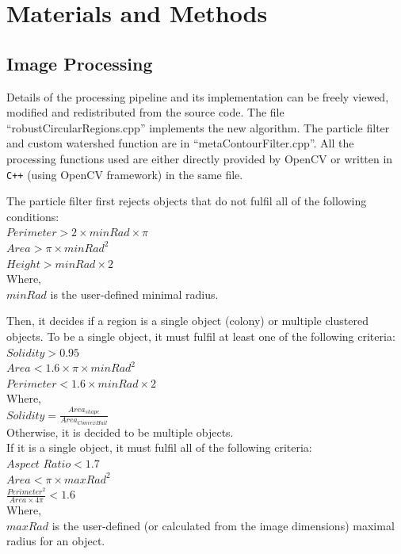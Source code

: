 \documentclass[10pt]{article}
\begin{document}
\section*{Materials and Methods} 

\subsection*{Image Processing} 
Details of the processing pipeline and its implementation can be freely viewed,
modified and redistributed from the source code. The file
``robustCircularRegions.cpp'' implements the new algorithm. The particle filter
and custom watershed function are in ``metaContourFilter.cpp''.
All the processing functions used are either directly provided by OpenCV or
written in \texttt{C++} (using OpenCV framework) in the same file.

The particle filter first rejects objects that do not fulfil all of the following conditions:\\
\newline{}
$Perimeter > 2\times{}minRad\times{}\pi $\\
$Area > \pi\times{}{minRad}^2$\\
$Height > minRad\times{}2$\\
\newline{}
Where,\\ 
$minRad$ is the user-defined minimal radius.

Then, it decides if a region is a single object (colony) or multiple clustered
objects. To be a single object, it must fulfil at least one of the following
criteria:\\
\newline{}
$Solidity > 0.95$\\
$Area <  1.6 \times{}\pi\times{}{minRad}^2$\\
$Perimeter < 1.6 \times{} minRad\times{}2$\\
\newline{}
Where,\\ $Solidity = \frac{Area_{shape}}{Area_{ConvexHull}}$\\
\newline{}
Otherwise, it is decided to be multiple objects.\\

If it is a single object, it must fulfil all of the following criteria:\\
\newline{}
$Aspect$ $Ratio < 1.7$\\
$Area <  \pi\times{}{maxRad}^2$\\
$\frac{Perimeter^2}{Area \times{} 4\pi } < 1.6$
\newline{}\\
Where,\\
$maxRad$ is the user-defined (or calculated from the image dimensions) maximal radius for an object.\\
\end{document}
